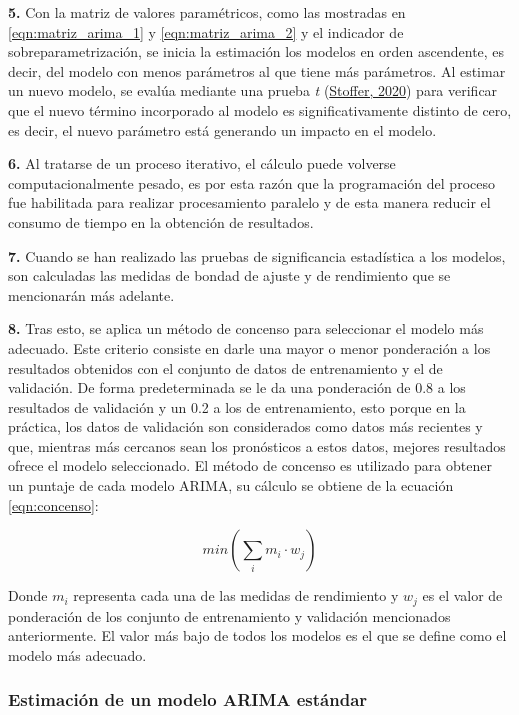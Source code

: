 \documentclass[
]{article}
\begin{document}
\textbf{5.} Con la matriz de valores paramétricos, como las mostradas en
\ref{eqn:matriz_arima_1} y \ref{eqn:matriz_arima_2} y el indicador de
sobreparametrización, se inicia la estimación los modelos en orden
ascendente, es decir, del modelo con menos parámetros al que tiene más
parámetros. Al estimar un nuevo modelo, se evalúa mediante una prueba
\emph{t} (\protect\hyperlink{ref-astsa}{Stoffer, 2020}) para verificar
que el nuevo término incorporado al modelo es significativamente
distinto de cero, es decir, el nuevo parámetro está generando un impacto
en el modelo.

\textbf{6.} Al tratarse de un proceso iterativo, el cálculo puede
volverse computacionalmente pesado, es por esta razón que la
programación del proceso fue habilitada para realizar procesamiento
paralelo y de esta manera reducir el consumo de tiempo en la obtención
de resultados.

\textbf{7.} Cuando se han realizado las pruebas de significancia
estadística a los modelos, son calculadas las medidas de bondad de
ajuste y de rendimiento que se mencionarán más adelante.

\textbf{8.} Tras esto, se aplica un método de concenso para seleccionar
el modelo más adecuado. Este criterio consiste en darle una mayor o
menor ponderación a los resultados obtenidos con el conjunto de datos de
entrenamiento y el de validación. De forma predeterminada se le da una
ponderación de 0.8 a los resultados de validación y un 0.2 a los de
entrenamiento, esto porque en la práctica, los datos de validación son
considerados como datos más recientes y que, mientras más cercanos sean
los pronósticos a estos datos, mejores resultados ofrece el modelo
seleccionado. El método de concenso es utilizado para obtener un puntaje
de cada modelo ARIMA, su cálculo se obtiene de la ecuación
\ref{eqn:concenso}:

\begin{equation}
\label{eqn:concenso}
min\left( \sum_i {m_i}\cdot w_j \right)
\end{equation}

Donde \(m_i\) representa cada una de las medidas de rendimiento y
\(w_j\) es el valor de ponderación de los conjunto de entrenamiento y
validación mencionados anteriormente. El valor más bajo de todos los
modelos es el que se define como el modelo más adecuado.

\subsubsection{Estimación de un modelo ARIMA estándar}
\end{document}
